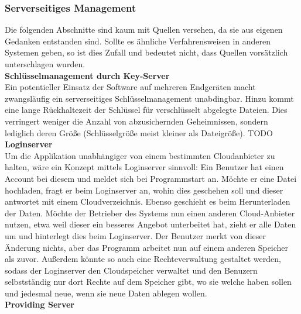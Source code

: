 \documentclass[12pt,a4paper,bibliography=totocnumbered,listof=totocnumbered]{scrartcl}
\begin{document}
\subsubsection{Serverseitiges Management}
Die folgenden Abschnitte sind kaum mit Quellen versehen, da sie aus eigenen Gedanken entstanden sind. Sollte es ähnliche Verfahrensweisen in anderen Systemen geben, so ist dies Zufall und bedeutet nicht, dass Quellen vorsätzlich unterschlagen wurden.\\
\textbf{Schlüsselmanagement durch Key-Server}\\
Ein potentieller Einsatz der Software auf mehreren Endgeräten macht zwangsläufig ein serverseitiges Schlüsselmanagement unabdingbar. Hinzu kommt eine lange Rückhaltezeit der Schlüssel für verschlüsselt abgelegte Dateien. Dies verringert weniger die Anzahl von abzusichernden Geheimnissen, sondern lediglich deren Größe (Schlüsselgröße meist kleiner als Dateigröße). TODO \cite{38}
\\\textbf{Loginserver}\\
Um die Applikation unabhängiger von einem bestimmten Cloudanbieter zu halten, wäre ein Konzept mittels Loginserver sinnvoll: Ein Benutzer hat einen Account bei diesem und meldet sich bei Programmstart an. Möchte er eine Datei hochladen, fragt er beim Loginserver an, wohin dies geschehen soll und dieser antwortet mit einem Cloudverzeichnis. Ebenso geschieht es beim Herunterladen der Daten. Möchte der Betrieber des Systems nun einen anderen Cloud-Anbieter nutzen, etwa weil dieser ein besseres Angebot unterbeitet hat, zieht er alle Daten um und hinterlegt dies beim Loginserver. Der Benutzer merkt von dieser Änderung nichts, aber das Programm arbeitet nun auf einem anderen Speicher als zuvor. Außerdem könnte so auch eine Rechteverwaltung gestaltet werden, sodass der Loginserver den Cloudspeicher verwaltet und den Benuzern selbstständig nur dort Rechte auf dem Speicher gibt, wo sie welche haben sollen und jedesmal neue, wenn sie neue Daten ablegen wollen.
\\\textbf{Providing Server}\label{provV}\\
\end{document}
